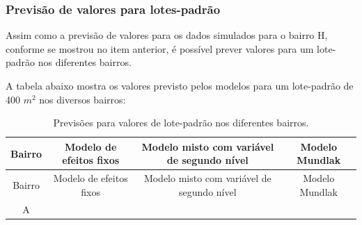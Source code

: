 \documentclass[
  a4paper, 11pt]{article}
\begin{document}
\hypertarget{previsuxe3o-de-valores-para-lotes-padruxe3o}{%
\subsubsection{Previsão de valores para
lotes-padrão}\label{previsuxe3o-de-valores-para-lotes-padruxe3o}}

Assim como a previsão de valores para os dados simulados para o bairro
H, conforme se mostrou no item anterior, é possível prever valores para
um lote-padrão nos diferentes bairros.

A tabela abaixo mostra os valores previsto pelos modelos para um
lote-padrão de 400 \(m^2\) nos diversos bairros:

\begin{longtable}[]{@{}cccc@{}}
\caption{Previsões para valores de lote-padrão nos diferentes
bairros.}\tabularnewline
\toprule
\begin{minipage}[b]{0.06\columnwidth}\centering
Bairro\strut
\end{minipage} & \begin{minipage}[b]{0.35\columnwidth}\centering
Modelo de efeitos fixos\strut
\end{minipage} & \begin{minipage}[b]{0.34\columnwidth}\centering
Modelo misto com variável de segundo nível\strut
\end{minipage} & \begin{minipage}[b]{0.13\columnwidth}\centering
Modelo Mundlak\strut
\end{minipage}\tabularnewline
\midrule
\endfirsthead
\toprule
\begin{minipage}[b]{0.06\columnwidth}\centering
Bairro\strut
\end{minipage} & \begin{minipage}[b]{0.35\columnwidth}\centering
Modelo de efeitos fixos\strut
\end{minipage} & \begin{minipage}[b]{0.34\columnwidth}\centering
Modelo misto com variável de segundo nível\strut
\end{minipage} & \begin{minipage}[b]{0.13\columnwidth}\centering
Modelo Mundlak\strut
\end{minipage}\tabularnewline
\midrule
\endhead
\begin{minipage}[t]{0.06\columnwidth}\centering
A\strut
\end{minipage} & \begin{minipage}[t]{0.35\columnwidth}\centering

\end{minipage}
\end{longtable}
\end{document}
